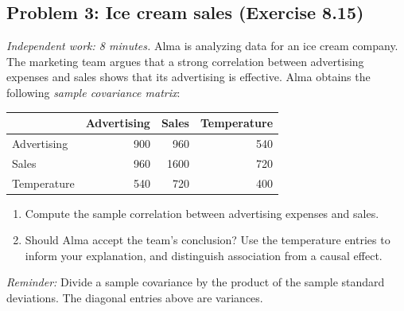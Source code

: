 \documentclass[11pt]{article}
\newcommand{\workingspace}[1]{}
\newcommand{\workingspace}[1]{\vspace{#1}}
\begin{document}
\subsection*{Problem 3: Ice cream sales (Exercise 8.15)}
\noindent\textit{Independent work: 8 minutes.}
Alma is analyzing data for an ice cream company. The marketing team
argues that a strong correlation between advertising expenses and sales
shows that its advertising is effective. Alma obtains the following
\emph{sample covariance matrix}:
\begin{center}
\begin{tabular}{@{}lrrr@{}}
\toprule
 & Advertising & Sales & Temperature\\
\midrule
Advertising & 900 & 960 & 540\\
Sales & 960 & 1600 & 720\\
Temperature & 540 & 720 & 400\\
\bottomrule
\end{tabular}
\end{center}
\begin{enumerate}
  \item Compute the sample correlation between advertising expenses and sales.
  \item Should Alma accept the team's conclusion? Use the temperature
    entries to inform your explanation, and distinguish association from
    a causal effect.
\end{enumerate}
\noindent\textit{Reminder:} Divide a sample covariance by the product of
the sample standard deviations. The diagonal entries above are variances.
\workingspace{11cm}
\end{document}
